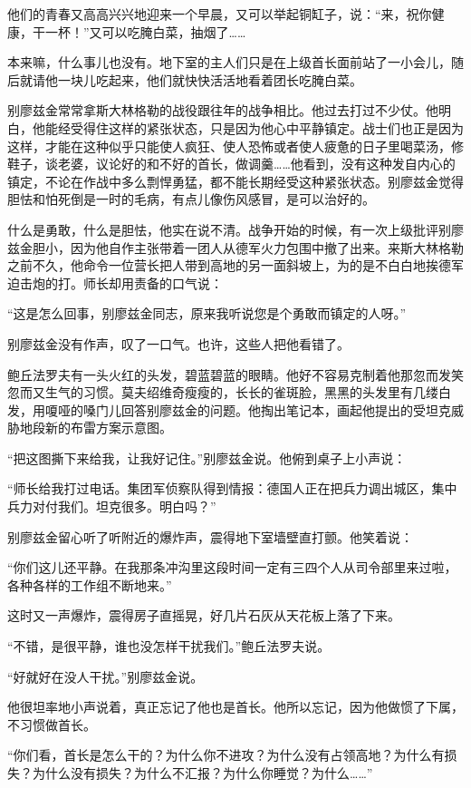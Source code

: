 他们的青春又高高兴兴地迎来一个早晨，又可以举起铜缸子，说：“来，祝你健康，干一杯！”又可以吃腌白菜，抽烟了……

本来嘛，什么事儿也没有。地下室的主人们只是在上级首长面前站了一小会儿，随后就请他一块儿吃起来，他们就快快活活地看着团长吃腌白菜。

别廖兹金常常拿斯大林格勒的战役跟往年的战争相比。他过去打过不少仗。他明白，他能经受得住这样的紧张状态，只是因为他心中平静镇定。战士们也正是因为这样，才能在这种似乎只能使人疯狂、使人恐怖或者使人疲惫的日子里喝菜汤，修鞋子，谈老婆，议论好的和不好的首长，做调羹……他看到，没有这种发自内心的镇定，不论在作战中多么剽悍勇猛，都不能长期经受这种紧张状态。别廖兹金觉得胆怯和怕死倒是一时的毛病，有点儿像伤风感冒，是可以治好的。

什么是勇敢，什么是胆怯，他实在说不清。战争开始的时候，有一次上级批评别廖兹金胆小，因为他自作主张带着一团人从德军火力包围中撤了出来。来斯大林格勒之前不久，他命令一位营长把人带到高地的另一面斜坡上，为的是不白白地挨德军迫击炮的打。师长却用责备的口气说：

“这是怎么回事，别廖兹金同志，原来我听说您是个勇敢而镇定的人呀。”

别廖兹金没有作声，叹了一口气。也许，这些人把他看错了。

鲍丘法罗夫有一头火红的头发，碧蓝碧蓝的眼睛。他好不容易克制着他那忽而发笑忽而又生气的习惯。莫夫绍维奇瘦瘦的，长长的雀斑脸，黑黑的头发里有几缕白发，用嗄哑的嗓门儿回答别廖兹金的问题。他掏出笔记本，画起他提出的受坦克威胁地段新的布雷方案示意图。

“把这图撕下来给我，让我好记住。”别廖兹金说。他俯到桌子上小声说：

“师长给我打过电话。集团军侦察队得到情报：德国人正在把兵力调出城区，集中兵力对付我们。坦克很多。明白吗？”

别廖兹金留心听了听附近的爆炸声，震得地下室墙壁直打颤。他笑着说：

“你们这儿还平静。在我那条冲沟里这段时间一定有三四个人从司令部里来过啦，各种各样的工作组不断地来。”

这时又一声爆炸，震得房子直摇晃，好几片石灰从天花板上落了下来。

“不错，是很平静，谁也没怎样干扰我们。”鲍丘法罗夫说。

“好就好在没人干扰。”别廖兹金说。

他很坦率地小声说着，真正忘记了他也是首长。他所以忘记，因为他做惯了下属，不习惯做首长。

“你们看，首长是怎么干的？为什么你不进攻？为什么没有占领高地？为什么有损失？为什么没有损失？为什么不汇报？为什么你睡觉？为什么……”

